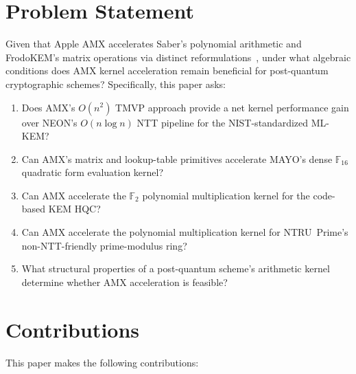 \documentclass[utf8]{FrontiersinHarvard}
\begin{document}
\section{Problem Statement}

Given that Apple AMX accelerates Saber's polynomial arithmetic and FrodoKEM's matrix operations via distinct reformulations~\cite{gazzoni2024pqcamx}, under what algebraic conditions does AMX kernel acceleration remain beneficial for post-quantum cryptographic schemes? Specifically, this paper asks:

\begin{enumerate}
  \item Does AMX's $O(n^2)$ TMVP approach provide a net kernel performance gain over NEON's $O(n \log n)$ NTT pipeline for the NIST-standardized ML-KEM?
  \item Can AMX's matrix and lookup-table primitives accelerate MAYO's dense $\mathbb{F}_{16}$ quadratic form evaluation kernel?
  \item Can AMX accelerate the $\mathbb{F}_2$ polynomial multiplication kernel for the code-based KEM HQC?
  \item Can AMX accelerate the polynomial multiplication kernel for NTRU~Prime's non-NTT-friendly prime-modulus ring?
  \item What structural properties of a post-quantum scheme's arithmetic kernel determine whether AMX acceleration is feasible?
\end{enumerate}


\section{Contributions}

This paper makes the following contributions:
\end{document}
